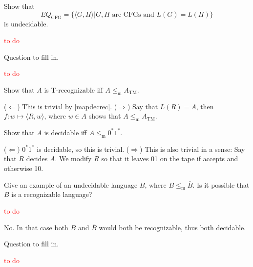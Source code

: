 \begin{exercise}
  Show that
  \[
    EQ_{\mathrm{CFG}}=\{\langle G,H\rangle|G,H\text{ are CFGs and }L(G)=L(H)\}
  \]
  is undecidable.
\end{exercise}

\textcolor{red}{to do}

\setcounter{exercise}{20}

\begin{exercise}
  Question to fill in.
\end{exercise}

\textcolor{red}{to do}

\begin{exercise}
  Show that $A$ is T-recognizable iff $A\leq_{\mathrm{m}}A_{\mathrm{TM}}$.
\end{exercise}

($\Leftarrow$) This is trivial by \ref{mapdecrec}.\newline
($\Rightarrow$) Say that $L(R)=A$, then $f:w\mapsto\langle R,w\rangle$, where $w\in A$ shows that $A\leq_{\mathrm{m}} A_{\mathrm{TM}}$.

\begin{exercise}
  Show that $A$ is decidable iff $A\leq_{\mathrm{m}}0^*1^*$.
\end{exercise}

($\Leftarrow$) $0^*1^*$ is decidable, so this is trivial.\newline
($\Rightarrow$) This is also trivial in a sense: Say that $R$ decides $A$. We modify $R$ so that it leaves 01 on the tape if accepts and otherwise 10.

\setcounter{exercise}{24}

\begin{exercise}
  Give an example of an undecidable language $B$, where $B\leq_{\mathrm{m}} \overline{B}$. Is it possible that $B$ is a recognizable language?
\end{exercise}

\textcolor{red}{to do}

No. In that case both $B$ and $\overline{B}$ would both be recognizable, thus both decidable.

\begin{exercise}
  Question to fill in.
\end{exercise}

\textcolor{red}{to do}

